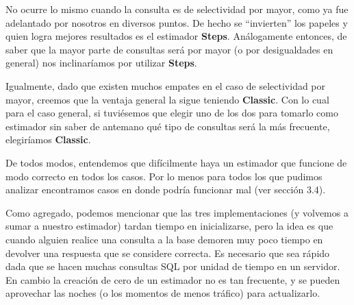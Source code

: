 No ocurre lo mismo cuando la consulta es de selectividad por mayor, como ya fue adelantado por nosotros en diversos puntos. De hecho se ``invierten'' los papeles y quien logra mejores resultados es el estimador \textbf{Steps}. Análogamente entonces, de saber que la mayor parte de consultas será por mayor (o por desigualdades en general) nos inclinaríamos por utilizar \textbf{Steps}.

Igualmente, dado que existen muchos empates en el caso de selectividad por mayor, creemos que la ventaja general la sigue teniendo \textbf{Classic}. Con lo cual para el caso general, si tuviésemos que elegir uno de los dos para tomarlo como estimador sin saber de antemano qué tipo de consultas será la más frecuente, elegiríamos \textbf{Classic}.

De todos modos, entendemos que difícilmente haya un estimador que funcione de modo correcto en todos los casos. Por lo menos para todos los que pudimos analizar encontramos casos en donde podría funcionar mal (ver sección 3.4).

Como agregado, podemos mencionar que las tres implementaciones (y volvemos a sumar a nuestro estimador) tardan tiempo en inicializarse, pero la idea es que cuando alguien realice una consulta a la base demoren muy poco tiempo en devolver una respuesta que se considere correcta. Es necesario que sea rápido dada que se hacen muchas consultas SQL por unidad de tiempo en un servidor. En cambio la creación de cero de un estimador no es tan frecuente, y se pueden aprovechar las noches (o los momentos de menos tráfico) para actualizarlo. 
